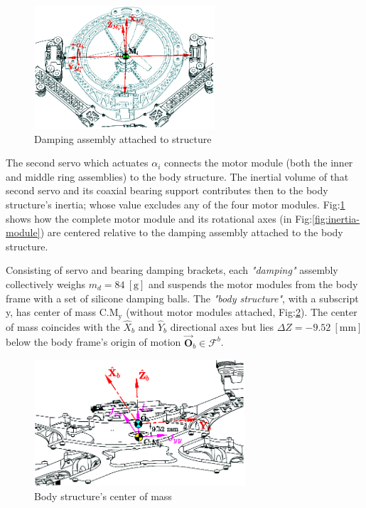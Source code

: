 \par
\begin{figure}[hbtp]
\vspace{-16pt}
\centering
\includegraphics[width=0.6\textwidth]{figs/inertia-damping}
\vspace{-8pt}
\caption{Damping assembly attached to structure}
\label{fig:inertia-damping}
\vspace{-18pt}
\end{figure}
\par
The second servo which actuates $\alpha_i$ connects the motor module (both the inner and middle ring assemblies) to the body structure. The inertial volume of that second servo and its coaxial bearing support contributes then to the body structure's inertia; whose value excludes any of the four motor modules. Fig:\ref{fig:inertia-damping} shows how the complete motor module and its rotational axes (in Fig:\ref{fig:inertia-module}) are centered relative to the damping assembly attached to the body structure.
\par
Consisting of servo and bearing damping brackets, each \emph{"damping"} assembly collectively weighs $m_{d}=84~[\text{g}]$ and suspends the motor modules from the body frame with a set of silicone damping balls. The \emph{"body structure"}, with a subscript y, has center of mass $\text{C.M}_{\text{y}}$ (without motor modules attached, Fig:\ref{fig:inertia-center}). The center of mass coincides with the $\hat{X}_b$ and $\hat{Y}_b$ directional axes but lies $\Delta Z=-9.52~[\text{mm}]$ below the body frame's origin of motion $\vec{\mathbf{O}}_b\in\mathcal{F}^b$.
\begin{figure}[hbtp]
\centering
\includegraphics[width=0.7\textwidth]{figs/inertia-center}
\caption{Body structure's center of mass}
\label{fig:inertia-center}
\vspace{-16pt}
\end{figure}
